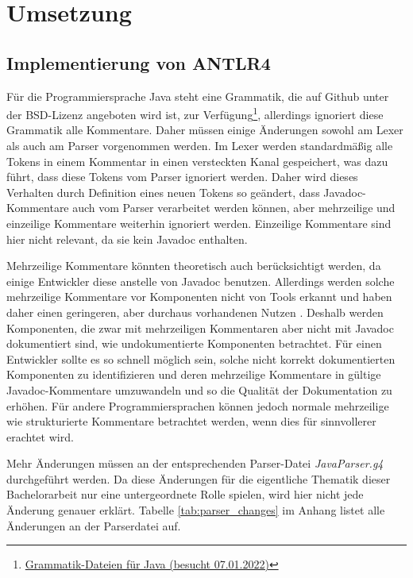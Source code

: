 \chapter{Umsetzung}
\section{Implementierung von ANTLR4}\label{chapter:antlr4_impl}
Für die Programmiersprache Java steht eine Grammatik, die auf Github unter der BSD-Lizenz angeboten wird ist, zur Verfügung\footnote{\href{https://github.com/antlr/grammars-v4/tree/master/java/java}{Grammatik-Dateien für Java (besucht 07.01.2022)}}, allerdings ignoriert diese Grammatik alle Kommentare. Daher müssen einige Änderungen sowohl am Lexer als auch am Parser vorgenommen werden. Im Lexer werden standardmäßig alle Tokens in einem Kommentar in einen versteckten Kanal gespeichert, was dazu führt, dass diese Tokens vom Parser ignoriert werden. Daher wird dieses Verhalten durch Definition eines neuen Tokens so geändert, dass Javadoc-Kommentare auch vom Parser verarbeitet werden können, aber mehrzeilige und einzeilige Kommentare weiterhin ignoriert werden. Einzeilige Kommentare sind hier nicht relevant, da sie kein Javadoc enthalten.

Mehrzeilige Kommentare könnten theoretisch auch berücksichtigt werden, da einige Entwickler diese anstelle von Javadoc benutzen. Allerdings werden solche mehrzeilige Kommentare vor Komponenten nicht von Tools erkannt und haben daher einen geringeren, aber durchaus vorhandenen Nutzen \cite[S. 4]{HowDocumentationEvolvesoverTime}. Deshalb werden Komponenten, die zwar mit mehrzeiligen Kommentaren aber nicht mit Javadoc dokumentiert sind, wie undokumentierte Komponenten betrachtet. Für einen Entwickler sollte es so schnell möglich sein, solche nicht korrekt dokumentierten Komponenten zu identifizieren und deren mehrzeilige Kommentare in gültige Javadoc-Kommentare umzuwandeln und so die Qualität der Dokumentation zu erhöhen. Für andere Programmiersprachen können jedoch normale mehrzeilige wie strukturierte Kommentare betrachtet werden, wenn dies für sinnvollerer erachtet wird.

Mehr Änderungen müssen an der entsprechenden Parser-Datei \textit{JavaParser.g4} durchgeführt werden.  Da diese Änderungen für die eigentliche Thematik dieser Bachelorarbeit nur eine untergeordnete Rolle spielen, wird hier nicht jede Änderung genauer erklärt. Tabelle \ref{tab:parser_changes} im Anhang listet alle Änderungen an der Parserdatei auf. 

